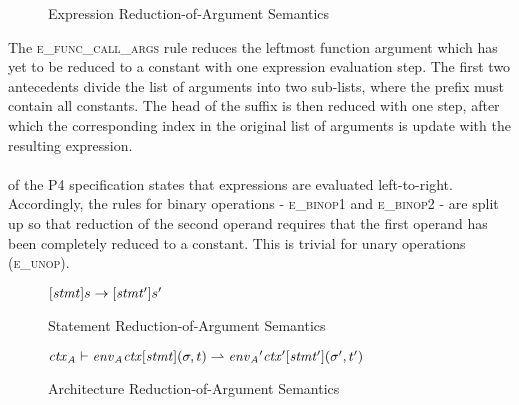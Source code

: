 \documentclass[UTF8]{article}
\begin{document}
\begin{figure}[ht!]
\caption{Expression Reduction-of-Argument Semantics}
\label{fig:semexp2}
\end{figure}

The \textsc{e\_func\_call\_args} rule reduces the leftmost function argument which has yet to be reduced to a constant with one expression evaluation step. The first two antecedents divide the list of arguments into two sub-lists, where the prefix must contain all constants. The head of the suffix is then reduced with one step, after which the corresponding index in the original list of arguments is update with the resulting expression.
\\~\\
 of the P4 specification states that expressions are evaluated left-to-right. Accordingly, the rules for binary operations - \textsc{e\_binop1} and \textsc{e\_binop2} - are split up so that reduction of the second operand requires that the first operand has been completely reduced to a constant. This is trivial for unary operations (\textsc{e\_unop}).

\begin{figure}[ht!]
\begin{ottdefnblock}{$[  \mathit{stmt}  ]  s  \rightarrow  [  \mathit{stmt'}  ]  s'$}{}
\ottusedrule{\ottdrulestmtXXretXXe{}}
\ottusedrule{\ottdrulestmtXXassXXe{}}
\ottusedrule{\ottdrulestmtXXcondXXe{}}
\ottusedrule{\ottdrulestmtXXverifyXXeOne{}}
\ottusedrule{\ottdrulestmtXXverifyXXeTwo{}}
\end{ottdefnblock}
\caption{Statement Reduction-of-Argument Semantics}
\label{fig:semstmt2}
\end{figure}

\begin{figure}[ht!]
\begin{ottdefnblock}[#1]{$ { \mathit{ctx}_\mathit{A} }  \vdash  { \mathit{env}_\mathit{A} }   \mathit{ctx}  [  \mathit{stmt}  ] (  \sigma  ,  t  ) \rightharpoonup  { \mathit{env}_\mathit{A} }'   \mathit{ctx}'  [  \mathit{stmt'}  ] (  \sigma'  ,  t'  ) $}{}
\ottusedrule{\ottdrulearchXXpblockXXargs{}}
\end{ottdefnblock}
\caption{Architecture Reduction-of-Argument Semantics}
\label{fig:semarch2}
\end{figure}
\end{document}
